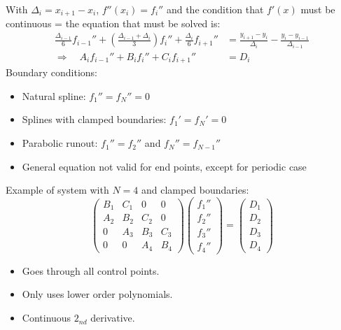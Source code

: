 \documentclass[8pt,a4paper]{scrartcl}
\renewcommand{\compaq}{\setlength{\itemsep}{0mm}\setlength{\parskip}{0cm}}
\begin{document}
\begin{multicols*}{3}
\finn

With $\Delta_i = x_{i+1} - x_i$, $f''(x_i) = f_i''$ and the condition that $f'(x)$ must be continuous = the equation that must be solved is:
\begin{equation*}
\begin{split}
\frac{\Delta_{i-1}}{6} f_{i-1}'' + (\frac{\Delta_{i-1} + \Delta_i}{3})f_i'' + \frac{\Delta_i}{6}f_{i+1}'' & = \frac{y_{i+1}-y_i}{\Delta_i} - \frac{y_i - y_{i-1}}{\Delta_{i-1}} \\
\Rightarrow \quad A_i f_{i-1}'' + B_i f_i'' + C_i f_{i+1}'' & = D_i
\end{split}
\end{equation*}
Boundary conditions:
\begin{itemize}\compaq
\item Natural spline: $f_1'' = f_N'' = 0$
\item Splines with clamped boundaries: $f_1' = f_N' = 0$
\item Parabolic runout: $f_1'' = f_2''$ and $f_N'' = f_{N-1}''$
\item General equation not valid for end points, except for periodic case
\end{itemize}
Example of system with $N = 4$ and clamped boundaries:
\begin{equation*}
\begin{pmatrix}
B_1 & C_1 & 0 & 0\\
A_2 & B_2 & C_2 & 0\\
0 & A_3 & B_3 & C_3\\
0 & 0 & A_4 & B_4
\end{pmatrix}
\begin{pmatrix}
f_1''\\
f_2''\\
f_3''\\
f_4''
\end{pmatrix}
=
\begin{pmatrix}
D_1\\
D_2\\
D_3\\
D_4
\end{pmatrix}
\end{equation*}

\begin{itemize}\compaq
\item
Goes through all control points.
\item
Only uses lower order polynomials.
\item
Continuous $2_{nd}$ derivative.
\end{itemize}


\end{multicols*}
\end{document}
